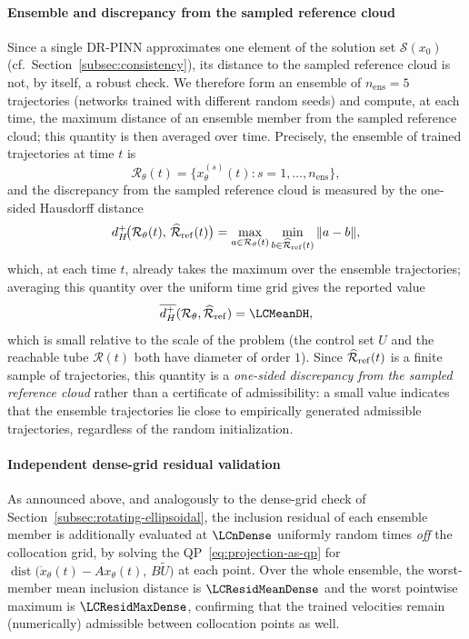 \documentclass[11pt]{elsarticle}
\theoremstyle{definition}
\theoremstyle{remark}
\numberwithin{equation}{section}
\def\dist{\operatorname{dist}}
\begin{document}
\paragraph{Ensemble and discrepancy from the sampled reference cloud}
Since a single DR-PINN approximates one element of the solution set
$\mathcal{S}(x_0)$ (cf.\ Section~\ref{subsec:consistency}), its distance to
the sampled reference cloud is not, by itself, a robust check. We therefore
form an ensemble of $n_{\mathrm{ens}} = 5$ trajectories (networks trained
with different random seeds) and compute, at each time, the maximum
distance of an ensemble member from the sampled reference cloud; this
quantity is then averaged over time. Precisely, the ensemble of trained
trajectories at time $t$ is
\[
  \mathcal{R}_\theta(t) = \bigl\{x_\theta^{(s)}(t) : s = 1,\dots,n_{\mathrm{ens}}\bigr\},
\]
and the discrepancy from the sampled reference cloud is measured by the
one-sided Hausdorff distance
\[
  d_H^+\!\bigl(\mathcal{R}_\theta(t),\,\widehat{\mathcal{R}}_{\rm ref}(t)\bigr)
  = \max_{a \in \mathcal{R}_\theta(t)}\min_{b \in \widehat{\mathcal{R}}_{\rm ref}(t)}\|a-b\|,
\]
which, at each time $t$, already takes the maximum over the ensemble
trajectories; averaging this quantity over the uniform time grid gives the
reported value
\[
  \overline{d_H^+}(\mathcal{R}_\theta,\widehat{\mathcal{R}}_{\rm ref}) = \LCMeanDH,
\]
which is small relative to the scale of the problem (the control set $U$ and
the reachable tube $\mathcal{R}(t)$ both have diameter of order $1$).
Since $\widehat{\mathcal{R}}_{\rm ref}(t)$ is a finite sample of
trajectories, this quantity is a \emph{one-sided discrepancy from the
sampled reference cloud} rather than a certificate of admissibility: a small
value indicates that the ensemble trajectories lie close to empirically
generated admissible trajectories, regardless of the random initialization.

\paragraph{Independent dense-grid residual validation}
As announced above, and analogously to the dense-grid check of
Section~\ref{subsec:rotating-ellipsoidal}, the inclusion residual of each
ensemble member is additionally evaluated at $\LCnDense$ uniformly random
times \emph{off} the collocation grid, by solving the
QP~\eqref{eq:projection-as-qp} for
$\dist\!\bigl(\dot x_\theta(t)-Ax_\theta(t),\,B\widetilde U\bigr)$ at each
point. Over the whole ensemble, the worst-member mean inclusion distance is
$\LCResidMeanDense$ and the worst pointwise maximum is
$\LCResidMaxDense$, confirming that the trained velocities remain
(numerically) admissible between collocation points as well.
\end{document}
